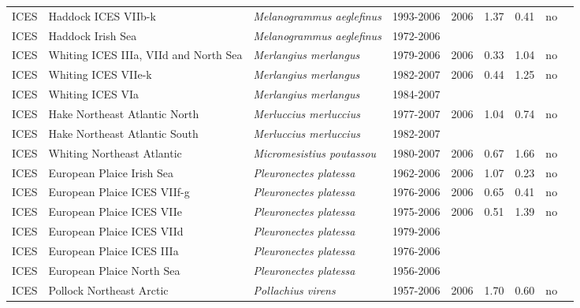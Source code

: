\begin{longtable}{p{1.8cm}p{4cm}p{4cm}ccccp{1.9cm}c}
  ICES & Haddock ICES VIIb-k & \textit{Melanogrammus aeglefinus} & 1993-2006 & 2006 & 1.37 & 0.41 & no & \cite{ICES-WGSSDS-2007.pdf} \\ 
  ICES & Haddock Irish Sea & \textit{Melanogrammus aeglefinus} & 1972-2006 &  &  &  &  & \cite{ICES-WGNSDS-2007.pdf} \\ 
  ICES & Whiting ICES IIIa, VIId and North Sea & \textit{Merlangius merlangus} & 1979-2006 & 2006 & 0.33 & 1.04 & no & \cite{ICES-WGNSSK-2007.pdf} \\ 
  ICES & Whiting ICES VIIe-k & \textit{Merlangius merlangus} & 1982-2007 & 2006 & 0.44 & 1.25 & no & \cite{ICES-WGSSDS-2007.pdf} \\ 
  ICES & Whiting ICES VIa & \textit{Merlangius merlangus} & 1984-2007 &  &  &  &  & \cite{ICES-WGNSDS-2007.pdf} \\ 
  ICES & Hake Northeast Atlantic North & \textit{Merluccius merluccius} & 1977-2007 & 2006 & 1.04 & 0.74 & no & \cite{ICES-WGHMM-2007.pdf} \\ 
  ICES & Hake Northeast Atlantic South & \textit{Merluccius merluccius} & 1982-2007 &  &  &  &  & \cite{ICES-WGHMM-2007.pdf} \\ 
  ICES & Whiting Northeast Atlantic & \textit{Micromesistius poutassou} & 1980-2007 & 2006 & 0.67 & 1.66 & no & \cite{ICES-WGNPBW-2007.pdf} \\ 
  ICES & European Plaice Irish Sea & \textit{Pleuronectes platessa} & 1962-2006 & 2006 & 1.07 & 0.23 & no & \cite{ICES-WGNSDS-2007.pdf} \\ 
  ICES & European Plaice ICES VIIf-g & \textit{Pleuronectes platessa} & 1976-2006 & 2006 & 0.65 & 0.41 & no & \cite{ICES-WGSSDS-2007.pdf} \\ 
  ICES & European Plaice ICES VIIe & \textit{Pleuronectes platessa} & 1975-2006 & 2006 & 0.51 & 1.39 & no & \cite{ICES-WGSSDS-2007.pdf} \\ 
  ICES & European Plaice ICES VIId & \textit{Pleuronectes platessa} & 1979-2006 &  &  &  &  & \cite{ICES-WGNSSK-2007.pdf} \\ 
  ICES & European Plaice ICES IIIa & \textit{Pleuronectes platessa} & 1976-2006 &  &  &  &  & \cite{ICES-WGNSSK-2007.pdf} \\ 
  ICES & European Plaice North Sea & \textit{Pleuronectes platessa} & 1956-2006 &  &  &  &  & \cite{ICES-WGNSSK-2007.pdf} \\ 
  ICES & Pollock Northeast Arctic & \textit{Pollachius virens} & 1957-2006 & 2006 & 1.70 & 0.60 & no & \cite{ICES-AFWG-2007.pdf} \\ 

\end{longtable}
